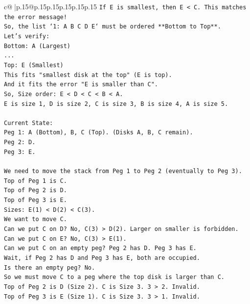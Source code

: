 \documentclass{article}
\begin{document}
{\begin{supertabular}{c@{$\;$}|p{.15\linewidth}@{}p{.15\linewidth}p{.15\linewidth}p{.15\linewidth}p{.15\linewidth}p{.15\linewidth}}
{{{\texttt{If E is smallest, then E < C. This matches the error message!} \\
\texttt{So, the list `1: A B C D E` must be ordered **Bottom to Top**.} \\
\texttt{Let's verify:} \\
\texttt{Bottom: A (Largest)} \\
\texttt{...} \\
\texttt{Top: E (Smallest)} \\
\texttt{This fits "smallest disk at the top" (E is top).} \\
\texttt{And it fits the error "E is smaller than C".} \\
\texttt{So, Size order: E < D < C < B < A.} \\
\texttt{E is size 1, D is size 2, C is size 3, B is size 4, A is size 5.} \\
\\ 
\texttt{Current State:} \\
\texttt{Peg 1: A (Bottom), B, C (Top). (Disks A, B, C remain).} \\
\texttt{Peg 2: D.} \\
\texttt{Peg 3: E.} \\
\\ 
\texttt{We need to move the stack from Peg 1 to Peg 2 (eventually to Peg 3).} \\
\texttt{Top of Peg 1 is C.} \\
\texttt{Top of Peg 2 is D.} \\
\texttt{Top of Peg 3 is E.} \\
\texttt{Sizes: E(1) < D(2) < C(3).} \\
\texttt{We want to move C.} \\
\texttt{Can we put C on D? No, C(3) > D(2). Larger on smaller is forbidden.} \\
\texttt{Can we put C on E? No, C(3) > E(1).} \\
\texttt{Can we put C on an empty peg? Peg 2 has D. Peg 3 has E.} \\
\texttt{Wait, if Peg 2 has D and Peg 3 has E, both are occupied.} \\
\texttt{Is there an empty peg? No.} \\
\texttt{So we must move C to a peg where the top disk is larger than C.} \\
\texttt{Top of Peg 2 is D (Size 2). C is Size 3. 3 > 2. Invalid.} \\
\texttt{Top of Peg 3 is E (Size 1). C is Size 3. 3 > 1. Invalid.} \\
}}}
\end{supertabular}}
\end{document}
